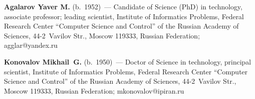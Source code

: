 
  
  
  \Contr
  
  \noindent
  \textbf{Agalarov Yaver M.} (b.\ 1952)~---  Candidate of Science (PhD) in technology, associate 
professor; leading scientist, Institute of Informatics Problems, Federal Research Center ``Computer Science 
and Control'' of the Russian Academy of Sciences, 44-2~Vavilov Str., Moscow 119333, Russian Federation; 
\mbox{agglar@yandex.ru}
   
   \vspace*{3pt}
   
  \noindent
  \textbf{Konovalov Mikhail~G.} (b.\ 1950)~--- Doctor of Science in technology, principal scientist, 
Institute of Informatics Problems, Federal Research Center ``Computer Science and Control'' of the Russian 
Academy of Sciences, 44-2~Vavilov Str., Moscow 119333, Russian Federation; 
\mbox{mkonovalov@ipiran.ru}
  
\label{end\stat}

\renewcommand{\bibname}{\protect\rm Литература} 
   